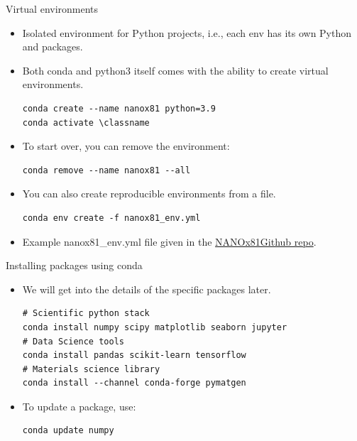 \documentclass[aspectratio=169]{beamer}
\newcommand{\classname}{NANOx81}
\begin{document}
\begin{frame}[fragile]{Virtual environments}
    \begin{itemize}
        \item Isolated environment for Python projects, i.e., each env has its own Python and packages.
        \item Both conda and python3 itself comes with the ability to create virtual environments.
        \begin{verbatim}
conda create --name nanox81 python=3.9
conda activate \classname
        \end{verbatim}
        \item To start over, you can remove the environment:
        \begin{verbatim}
conda remove --name nanox81 --all
        \end{verbatim}
        \item You can also create reproducible environments from a file.
        \begin{verbatim}
conda env create -f nanox81_env.yml
        \end{verbatim}
        \item Example nanox81\_env.yml file given in the \href{https://github.com/materialsvirtuallab/\classname}{\classname Github repo}.
    \end{itemize}
\end{frame}


\begin{frame}[fragile]{Installing packages using conda}
    \begin{itemize}
        \item We will get into the details of the specific packages later.
    \begin{verbatim}
# Scientific python stack
conda install numpy scipy matplotlib seaborn jupyter
# Data Science tools
conda install pandas scikit-learn tensorflow
# Materials science library
conda install --channel conda-forge pymatgen
    \end{verbatim}
        \item To update a package, use:
    \begin{verbatim}
conda update numpy
    \end{verbatim}
    \end{itemize}
\end{frame}
\end{document}
